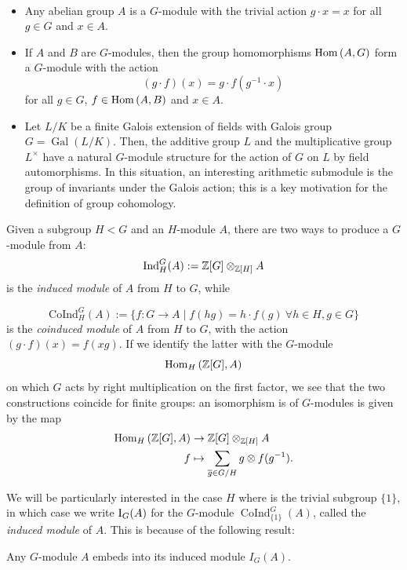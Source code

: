 \documentclass[a4paper, oneside]{memoir}
\begin{document}
\begin{example}[$G$-modules]\
	\begin{itemize}
		\item Any abelian group $A$ is a $G$-module with the trivial action $g\cdot x=x$ for all $g\in G$ and $x\in A$.
		\item If $A$ and $B$ are $G$-modules, then the group homomorphisms $\operatorname{Hom}{(A,G)}$ form a $G$-module with the action
		      \[
			      (g\cdot f)(x)=g\cdot f(g^{-1}\cdot x)
		      \]
		      for all $g\in G$, $f\in\operatorname{Hom}{(A,B)}$ and $x\in A$.
		\item Let $L / K$ be a finite Galois extension of fields with Galois group $G=\operatorname{Gal}{(L / K)}$. Then, the additive group $L$ and the multiplicative group $L^\times$ have a natural $G$-module structure for the action of $G$ on $L$ by field automorphisms. In this situation, an interesting arithmetic submodule is the group of invariants under the Galois action; this is a key motivation for the definition of group cohomology.
	\end{itemize}
\end{example}


Given a subgroup $H<G$ and an $H$-module $A$, there are two ways to produce a $G$-module from $A$:
\[
	\mathrm{Ind}^G_H{(A)}:=\mathbb{Z}[G]\otimes_{\mathbb{Z}[H]}{A}
\]
is the \textit{induced module} of $A$ from $H$ to $G$, while

\[
	\mathrm{CoInd}^G_H{(A)}:=\{f:G\to A \mid f(hg)=h\cdot f(g) ~\forall h\in H, g\in G\}
\]
is the \textit{coinduced module} of $A$ from $H$ to $G$, with the action $(g \cdot f)(x)=f(xg)$. If we identify the latter with the $G$-module
\[
	\operatorname{Hom}_H{(\mathbb{Z}[G],A)}
\]
on which $G$ acts by right multiplication on the first factor, we see that the two constructions coincide for finite groups: an isomorphism is of $G$-modules is given by the map
\begin{align}
	\operatorname{Hom}_H{(\mathbb{Z}[G],A)} & \to \mathbb{Z}[G]\otimes_{\mathbb{Z}[H]}{A}                                \nonumber       \\
	f                 & \mapsto \sum_{\overline{g} \in G / H}{g\otimes f(g^{-1})}\label{eq:IndIso}.
\end{align}

We will be particularly interested in the case $H$ where is the trivial subgroup $\{1\}$, in which case we write $\operatorname{I}_{G}(A)$ for the $G$-module $\operatorname{CoInd}^G_{\{1\}}{(A)}$, called the \textit{induced module} of $A$. This is because of the following result:

\begin{proposition}
	Any $G$-module $A$ embeds into its induced module $I_G(A)$.
\end{proposition}
\end{document}
